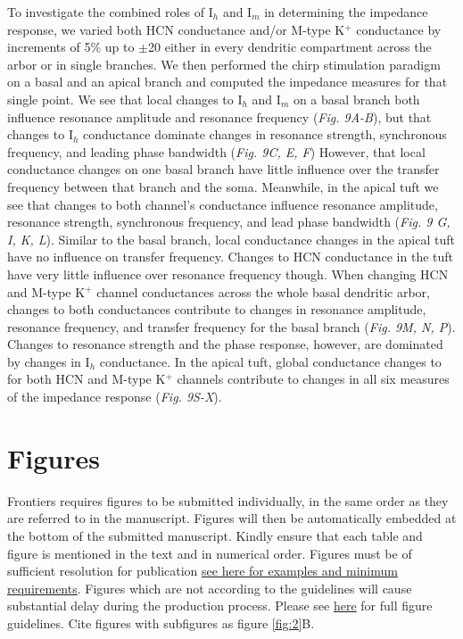 \documentclass[utf8]{frontiersSCNS} %
\begin{document}
To investigate the combined roles of I$_h$ and I$_m$ in determining the impedance response, we varied both HCN 
conductance and/or M-type K$^+$ conductance by increments of 5\% up to $\pm$20 either in every dendritic compartment 
across the arbor or in single branches.  
We then performed the chirp stimulation paradigm on a basal and an apical branch and computed the impedance measures for that single point.  
We see that local changes to I$_h$ and I$_m$ on a basal branch both influence resonance 
amplitude and resonance frequency (\emph{Fig. 9A-B}), but that changes to I$_h$ 
conductance dominate changes in resonance strength, synchronous frequency, and leading phase bandwidth (\emph{Fig. 9C, E, F})
However, that local conductance changes on one basal branch have little influence over the transfer frequency between that branch and the soma.
Meanwhile, in the apical tuft we see that changes to both channel's conductance influence resonance amplitude, resonance strength, synchronous frequency, and lead phase bandwidth (\emph{Fig. 9 G, I, K, L}).
Similar to the basal branch, local conductance changes in the apical tuft have no influence on transfer frequency.
Changes to HCN conductance in the tuft have very little influence over resonance frequency though.
When changing HCN and M-type K$^+$ channel conductances across the whole basal dendritic arbor, changes to both conductances contribute to changes in resonance amplitude, resonance frequency, and transfer frequency for the basal branch (\emph{Fig. 9M, N, P}).
Changes to resonance strength and the phase response, however, are dominated by changes in I$_h$ conductance.
In the apical tuft, global conductance changes to for both HCN and M-type K$^+$ channels contribute to changes in all six measures of the impedance response (\emph{Fig. 9S-X}).

\section{Figures}
Frontiers requires figures to be submitted individually, in the same order as they are referred to in the manuscript. Figures will then be automatically embedded at the bottom of the submitted manuscript. Kindly ensure that each table and figure is mentioned in the text and in numerical order. Figures must be of sufficient resolution for publication \href{http://home.frontiersin.org/about/author-guidelines#ResolutionRequirements}{see here for examples and minimum requirements}. Figures which are not according to the guidelines will cause substantial delay during the production process. Please see \href{http://home.frontiersin.org/about/author-guidelines#GeneralStyleGuidelinesforFigures}{here} for full figure guidelines. Cite figures with subfigures as figure \ref{fig:2}B.
\end{document}
